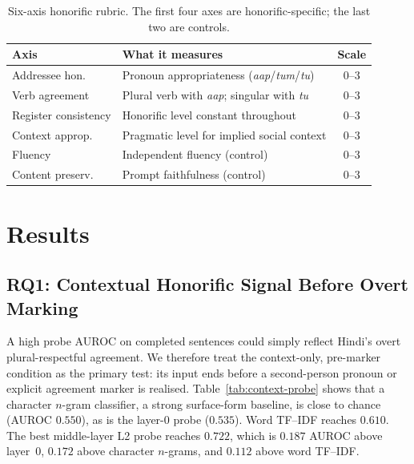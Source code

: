 \documentclass[11pt]{article}
\newcommand{\aap}{\textit{aap}}
\newcommand{\tum}{\textit{tum}}
\newcommand{\tu}{\textit{tu}}
\begin{document}
\begin{table}[t]
\centering
\small
\setlength\tabcolsep{3pt}
\begin{tabular}{lp{3.2cm}c}
\toprule
\textbf{Axis} & \textbf{What it measures} & \textbf{Scale} \\
\midrule
Addressee hon. & Pronoun appropriateness (\aap/\tum/\tu) & 0--3 \\
Verb agreement & Plural verb with \aap; singular with \tu & 0--3 \\
Register consistency & Honorific level constant throughout & 0--3 \\
Context approp. & Pragmatic level for implied social context & 0--3 \\
Fluency & Independent fluency (control) & 0--3 \\
Content preserv. & Prompt faithfulness (control) & 0--3 \\
\bottomrule
\end{tabular}
\caption{Six-axis honorific rubric. The first four axes are honorific-specific;
  the last two are controls.}
\label{tab:rubric}
\end{table}

\section{Results}
\label{sec:results}

\subsection{RQ1: Contextual Honorific Signal Before Overt Marking}
\label{sec:context-results}

A high probe AUROC on completed sentences could simply reflect Hindi's overt
plural-respectful agreement. We therefore treat the context-only, pre-marker
condition as the primary test: its input ends before a second-person pronoun or
explicit agreement marker is realised. Table~\ref{tab:context-probe} shows that
a character $n$-gram classifier, a strong surface-form baseline, is close to
chance (AUROC $0.550$), as is the layer-0 probe ($0.535$). Word TF--IDF reaches
$0.610$. The best middle-layer L2 probe reaches $0.722$, which is $0.187$ AUROC
above layer~0, $0.172$ above character $n$-grams, and $0.112$ above word
TF--IDF.
\end{document}
